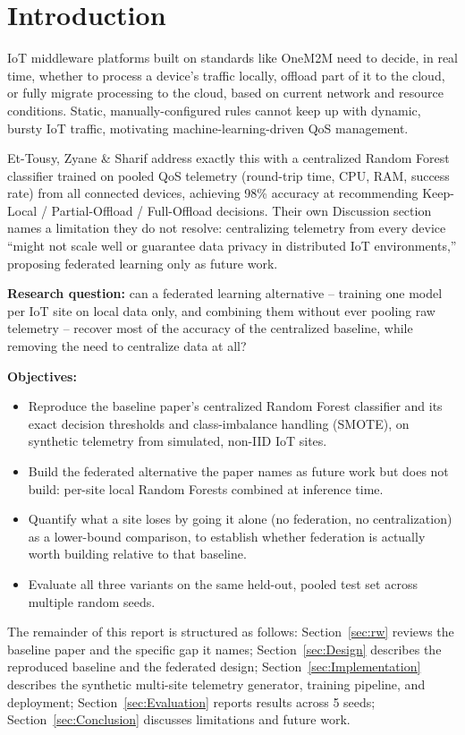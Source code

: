 
\section{Introduction}
\label{sec:Introduction}

IoT middleware platforms built on standards like OneM2M need to decide, in real time, whether to process a device's traffic locally, offload part of it to the cloud, or fully migrate processing to the cloud, based on current network and resource conditions. Static, manually-configured rules cannot keep up with dynamic, bursty IoT traffic, motivating machine-learning-driven QoS management.

Et-Tousy, Zyane \& Sharif \cite{EtTousy26} address exactly this with a centralized Random Forest classifier trained on pooled QoS telemetry (round-trip time, CPU, RAM, success rate) from all connected devices, achieving 98\% accuracy at recommending Keep-Local / Partial-Offload / Full-Offload decisions. Their own Discussion section names a limitation they do not resolve: centralizing telemetry from every device ``might not scale well or guarantee data privacy in distributed IoT environments,'' proposing federated learning only as future work.

\textbf{Research question:} can a federated learning alternative -- training one model per IoT site on local data only, and combining them without ever pooling raw telemetry -- recover most of the accuracy of the centralized baseline, while removing the need to centralize data at all?

\textbf{Objectives:}
\begin{itemize}
  \item Reproduce the baseline paper's centralized Random Forest classifier and its exact decision thresholds and class-imbalance handling (SMOTE), on synthetic telemetry from simulated, non-IID IoT sites.
  \item Build the federated alternative the paper names as future work but does not build: per-site local Random Forests combined at inference time.
  \item Quantify what a site loses by going it alone (no federation, no centralization) as a lower-bound comparison, to establish whether federation is actually worth building relative to that baseline.
  \item Evaluate all three variants on the same held-out, pooled test set across multiple random seeds.
\end{itemize}

The remainder of this report is structured as follows: Section~\ref{sec:rw} reviews the baseline paper and the specific gap it names; Section~\ref{sec:Design} describes the reproduced baseline and the federated design; Section~\ref{sec:Implementation} describes the synthetic multi-site telemetry generator, training pipeline, and deployment; Section~\ref{sec:Evaluation} reports results across 5 seeds; Section~\ref{sec:Conclusion} discusses limitations and future work.
